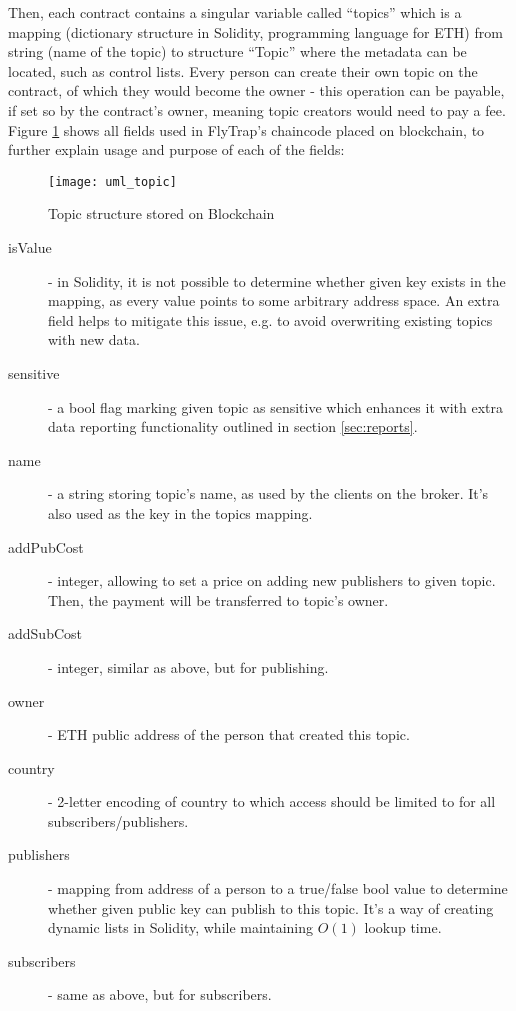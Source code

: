 Then, each contract contains a singular variable called ``topics'' which is a mapping (dictionary structure in Solidity, programming language for ETH) from string (name of the topic) to structure ``Topic'' where the metadata can be located, such as control lists. Every person can create their own topic on the contract, of which they would become the owner - this operation can be payable, if set so by the contract's owner, meaning topic creators would need to pay a fee. Figure \ref{fig:uml_topic} shows all fields used in FlyTrap's chaincode placed on blockchain, to further explain usage and purpose of each of the fields:
\begin{figure}[h]
    \centering
    \texttt{[image: uml\_topic]}
    \caption{Topic structure stored on Blockchain}
    \label{fig:uml_topic}
\end{figure}
\begin{description}
    \item[isValue] - in Solidity, it is not possible to determine whether given key exists in the mapping, as every value points to some arbitrary address space. An extra field helps to mitigate this issue, e.g. to avoid overwriting existing topics with new data.
    \item[sensitive] - a bool flag marking given topic as sensitive which enhances it with extra data reporting functionality outlined in section \ref{sec:reports}.
    \item[name] - a string storing topic's name, as used by the clients on the broker. It's also used as the key in the topics mapping.
    \item[addPubCost] - integer, allowing to set a price on adding new publishers to given topic. Then, the payment will be transferred to topic's owner.
    \item[addSubCost] - integer, similar as above, but for publishing.
    \item[owner] - ETH public address of the person that created this topic.
    \item[country] - 2-letter encoding of country to which access should be limited to for all subscribers/publishers.
    \item[publishers] - mapping from address of a person to a true/false bool value to determine whether given public key can publish to this topic. It's a way of creating dynamic lists in Solidity, while maintaining $O(1)$ lookup time.
    \item[subscribers] - same as above, but for subscribers.
\end{description}

